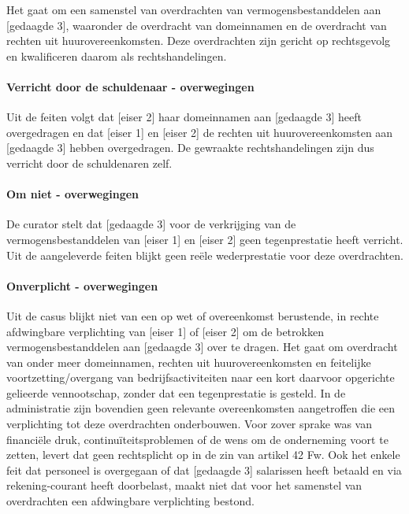 \documentclass[
  dutch,
  a4paper,
]{article}
\begin{document}
Het gaat om een samenstel van overdrachten van vermogensbestanddelen aan {[}gedaagde 3{]}, waaronder de overdracht van domeinnamen en de overdracht van rechten uit huurovereenkomsten. Deze overdrachten zijn gericht op rechtsgevolg en kwalificeren daarom als rechtshandelingen.

\paragraph{Verricht door de schuldenaar - overwegingen}\label{verricht-door-de-schuldenaar---overwegingen-19}

Uit de feiten volgt dat {[}eiser 2{]} haar domeinnamen aan {[}gedaagde 3{]} heeft overgedragen en dat {[}eiser 1{]} en {[}eiser 2{]} de rechten uit huurovereenkomsten aan {[}gedaagde 3{]} hebben overgedragen. De gewraakte rechtshandelingen zijn dus verricht door de schuldenaren zelf.

\paragraph{Om niet - overwegingen}\label{om-niet---overwegingen-19}

De curator stelt dat {[}gedaagde 3{]} voor de verkrijging van de vermogensbestanddelen van {[}eiser 1{]} en {[}eiser 2{]} geen tegenprestatie heeft verricht. Uit de aangeleverde feiten blijkt geen reële wederprestatie voor deze overdrachten.

\paragraph{Onverplicht - overwegingen}\label{onverplicht---overwegingen-19}

Uit de casus blijkt niet van een op wet of overeenkomst berustende, in rechte afdwingbare verplichting van {[}eiser 1{]} of {[}eiser 2{]} om de betrokken vermogensbestanddelen aan {[}gedaagde 3{]} over te dragen. Het gaat om overdracht van onder meer domeinnamen, rechten uit huurovereenkomsten en feitelijke voortzetting/overgang van bedrijfsactiviteiten naar een kort daarvoor opgerichte gelieerde vennootschap, zonder dat een tegenprestatie is gesteld. In de administratie zijn bovendien geen relevante overeenkomsten aangetroffen die een verplichting tot deze overdrachten onderbouwen. Voor zover sprake was van financiële druk, continuïteitsproblemen of de wens om de onderneming voort te zetten, levert dat geen rechtsplicht op in de zin van artikel 42 Fw. Ook het enkele feit dat personeel is overgegaan of dat {[}gedaagde 3{]} salarissen heeft betaald en via rekening-courant heeft doorbelast, maakt niet dat voor het samenstel van overdrachten een afdwingbare verplichting bestond.
\end{document}
